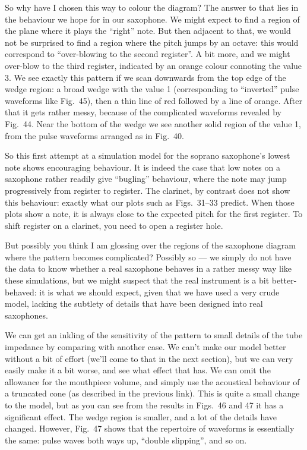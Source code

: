   So why have I chosen this way to colour the diagram? The answer to that lies 
  in the behaviour we hope for in our saxophone. We might expect to find a 
  region of the plane where it plays the “right” note. But then adjacent to 
  that, we would not be surprised to find a region where the pitch jumps by an 
  octave: this would correspond to “over-blowing to the second register”. A bit 
  more, and we might over-blow to the third register, indicated by an orange 
  colour connoting the value 3. We see exactly this pattern if we scan 
  downwards from the top edge of the wedge region: a broad wedge with the value 
  1 (corresponding to “inverted” pulse waveforms like Fig.\ 45), then a thin 
  line of red followed by a line of orange. After that it gets rather messy, 
  because of the complicated waveforms revealed by Fig.\ 44. Near the bottom of 
  the wedge we see another solid region of the value 1, from the pulse 
  waveforms arranged as in Fig.\ 40. 

  So this first attempt at a simulation model for the soprano saxophone’s 
  lowest note shows encouraging behaviour. It is indeed the case that low notes 
  on a saxophone rather readily give ``bugling'' behaviour, where the note may 
  jump progressively from register to register. The clarinet, by contrast does 
  not show this behaviour: exactly what our plots such as Figs.\ 31--33 
  predict. When those plots show a note, it is always close to the expected 
  pitch for the first register. To shift register on a clarinet, you need to 
  open a register hole. 

  But possibly you think I am glossing over the regions of the saxophone 
  diagram where the pattern becomes complicated? Possibly so --- we simply do 
  not have the data to know whether a real saxophone behaves in a rather messy 
  way like these simulations, but we might suspect that the real instrument is 
  a bit better-behaved: it is what we should expect, given that we have used a 
  very crude model, lacking the subtlety of details that have been designed 
  into real saxophones. 

  We can get an inkling of the sensitivity of the pattern to small details of 
  the tube impedance by comparing with another case. We can’t make our model 
  better without a bit of effort (we'll come to that in the next section), but 
  we can very easily make it a bit worse, and see what effect that has. We can 
  omit the allowance for the mouthpiece volume, and simply use the acoustical 
  behaviour of a truncated cone (as described in the previous link). This is 
  quite a small change to the model, but as you can see from the results in 
  Figs.\ 46 and 47 it has a significant effect. The wedge region is smaller, 
  and a lot of the details have changed. However, Fig.\ 47 shows that the 
  repertoire of waveforms is essentially the same: pulse waves both ways up, 
  “double slipping”, and so on. 

